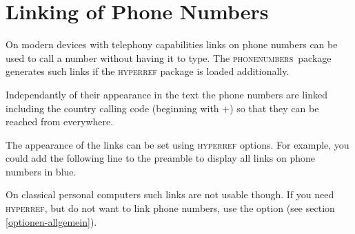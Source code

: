 \documentclass[numbers=noenddot]{scrreprt}
\newcommand*\Paket[1]{\textsc{#1}}
\newcommand\phone{\textcolor{cnltx}{\Paket{phone\-numbers}}}
\newcommand*\sieheAbschnitt[1]{(see section \ref{#1})}
\begin{document}
\section{Linking of Phone Numbers} \label{verlinkung}
On modern devices with telephony capabilities links on phone numbers can be used to call a number without having it to type. The \phone\ package generates such links if the \Paket{hyperref} package
\cite{hyperref}
is loaded additionally.

Independantly of their appearance in the text the phone numbers are linked including the country calling code (beginning with +) so that they can be reached from everywhere.

The appearance of the links can be set using \Paket{hyperref} options. For example, you could add the following line to the preamble to display all links on phone numbers in blue.

\begin{sourcecode}
  \usepackage[colorlinks=true,urlcolor=blue]{hyperref}
\end{sourcecode}

On classical personal computers such links are not usable though. If you need \Paket{hyperref}, but do not want to link phone numbers, use the  option
\sieheAbschnitt{optionen-allgemein}.
\end{document}
